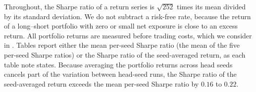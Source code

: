 Throughout, the Sharpe ratio of a return series is $\sqrt{252}$ times its mean divided by its standard deviation. We do not subtract a risk-free rate, because the return of a long--short portfolio with zero or small net exposure is close to an excess return. All portfolio returns are measured before trading costs, which we consider in . Tables report either the mean per-seed Sharpe ratio (the mean of the five per-seed Sharpe ratios) or the
Sharpe ratio of the seed-averaged return, as each table note states.
Because averaging the portfolio returns across head seeds cancels part of the variation between head-seed runs, the Sharpe ratio of the seed-averaged return exceeds the mean per-seed Sharpe ratio by $0.16$ to $0.22$.
